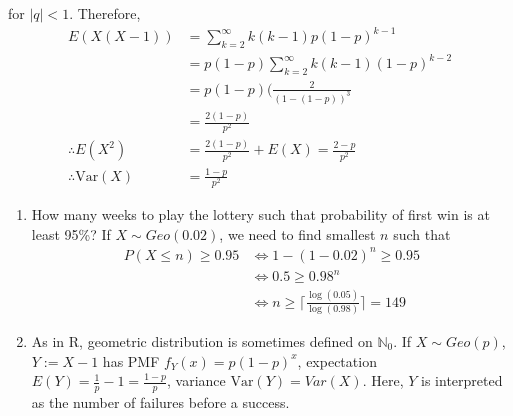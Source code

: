 \documentclass{article}
\newcommand{\N}{\mathbb{N}}
\newcommand{\Var}{\mathrm{Var}}
\begin{document}
\begin{itemize}
					for $|q|<1$. Therefore,
					\begin{align*}
						E(X(X-1))&=\sum_{k=2}^{\infty}k(k-1)p(1-p)^{k-1}\\
						&=p(1-p)\sum_{k=2}^{\infty}k(k-1)(1-p)^{k-2}\\
						&=p(1-p)(\frac{2}{(1-(1-p))^3}\\
						&=\frac{2(1-p)}{p^2}\\
						\therefore E(X^2)&=\frac{2(1-p)}{p^2}+E(X)=\frac{2-p}{p^2}\\
						\therefore\Var(X)&=\frac{1-p}{p^2}
					\end{align*}
					\begin{myrem*}{}{}
						\begin{enumerate}
							\item How many weeks to play the lottery such that probability of first win is at least 95\%? If $X\sim Geo(0.02)$, we need to find smallest $n$ such that
							\begin{align*}
								P(X\leq n)\geq0.95&\Leftrightarrow1-(1-0.02)^n\geq0.95\\
								&\Leftrightarrow0.5\geq0.98^n\\
								&\Leftrightarrow n\geq\lceil\frac{\log(0.05)}{\log(0.98)}\rceil=149
							\end{align*}
							
							\item As in R, geometric distribution is sometimes defined on $\N_0$. If $X\sim Geo(p)$, $Y:=X-1$ has PMF $f_Y(x)=p(1-p)^x$, expectation $E(Y)=\frac{1}{p}-1=\frac{1-p}{p}$, variance $\Var(Y)=Var(X)$. Here, $Y$ is interpreted as the number of failures before a success.
						\end{enumerate}
					\end{myrem*}
				\end{itemize}
				
\end{document}
